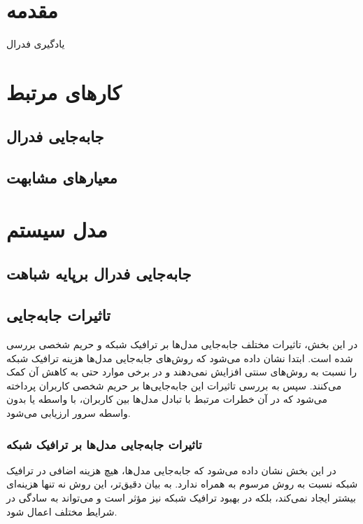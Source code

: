 
\section{مقدمه}
یادگیری فدرال

\section{کارهای مرتبط}
\subsection{جابه‌جایی فدرال}
\subsection{معیارهای مشابهت}
 
\section{مدل سیستم}
\subsection{جابه‌جایی فدرال برپایه شباهت}
\subsection{تاثیرات جابه‌جایی}

در این بخش، تاثیرات مختلف جابه‌جایی مدل‌ها بر ترافیک شبکه و حریم شخصی بررسی شده است. ابتدا نشان داده می‌شود که روش‌های جابه‌جایی مدل‌ها هزینه ترافیک شبکه را نسبت به روش‌های سنتی افزایش نمی‌دهند و در برخی موارد حتی به کاهش آن کمک می‌کنند. سپس به بررسی تاثیرات این جابه‌جایی‌ها بر حریم شخصی کاربران پرداخته می‌شود که در آن خطرات مرتبط با تبادل مدل‌ها بین کاربران، با واسطه یا بدون واسطه سرور ارزیابی می‌شود.

\subsubsection{تاثیرات جابه‌جایی مدل‌ها بر ترافیک شبکه}
در این بخش نشان داده می‌شود که
جابه‌جایی مدل‌ها، هیچ هزینه اضافی در ترافیک شبکه نسبت به روش مرسوم  به همراه ندارد. به بیان دقیق‌تر، این روش نه تنها هزینه‌ای بیشتر ایجاد نمی‌کند، بلکه در بهبود ترافیک شبکه نیز مؤثر است و می‌تواند به سادگی در شرایط مختلف اعمال شود. 


